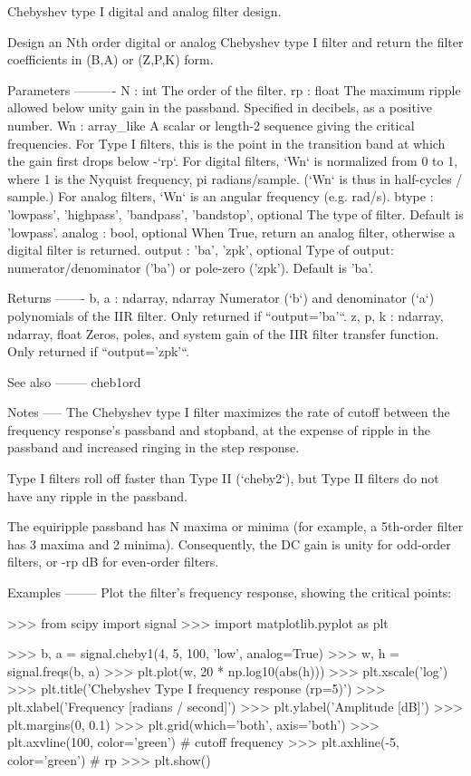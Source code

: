 \begin{DoxyVerb}Chebyshev type I digital and analog filter design.

Design an Nth order digital or analog Chebyshev type I filter and
return the filter coefficients in (B,A) or (Z,P,K) form.

Parameters
----------
N : int
    The order of the filter.
rp : float
    The maximum ripple allowed below unity gain in the passband.
    Specified in decibels, as a positive number.
Wn : array_like
    A scalar or length-2 sequence giving the critical frequencies.
    For Type I filters, this is the point in the transition band at which
    the gain first drops below -`rp`.
    For digital filters, `Wn` is normalized from 0 to 1, where 1 is the
    Nyquist frequency, pi radians/sample.  (`Wn` is thus in
    half-cycles / sample.)
    For analog filters, `Wn` is an angular frequency (e.g. rad/s).
btype : {'lowpass', 'highpass', 'bandpass', 'bandstop'}, optional
    The type of filter.  Default is 'lowpass'.
analog : bool, optional
    When True, return an analog filter, otherwise a digital filter is
    returned.
output : {'ba', 'zpk'}, optional
    Type of output:  numerator/denominator ('ba') or pole-zero ('zpk').
    Default is 'ba'.

Returns
-------
b, a : ndarray, ndarray
    Numerator (`b`) and denominator (`a`) polynomials of the IIR filter.
    Only returned if ``output='ba'``.
z, p, k : ndarray, ndarray, float
    Zeros, poles, and system gain of the IIR filter transfer
    function.  Only returned if ``output='zpk'``.

See also
--------
cheb1ord

Notes
-----
The Chebyshev type I filter maximizes the rate of cutoff between the
frequency response's passband and stopband, at the expense of ripple in
the passband and increased ringing in the step response.

Type I filters roll off faster than Type II (`cheby2`), but Type II
filters do not have any ripple in the passband.

The equiripple passband has N maxima or minima (for example, a
5th-order filter has 3 maxima and 2 minima).  Consequently, the DC gain is
unity for odd-order filters, or -rp dB for even-order filters.

Examples
--------
Plot the filter's frequency response, showing the critical points:

>>> from scipy import signal
>>> import matplotlib.pyplot as plt

>>> b, a = signal.cheby1(4, 5, 100, 'low', analog=True)
>>> w, h = signal.freqs(b, a)
>>> plt.plot(w, 20 * np.log10(abs(h)))
>>> plt.xscale('log')
>>> plt.title('Chebyshev Type I frequency response (rp=5)')
>>> plt.xlabel('Frequency [radians / second]')
>>> plt.ylabel('Amplitude [dB]')
>>> plt.margins(0, 0.1)
>>> plt.grid(which='both', axis='both')
>>> plt.axvline(100, color='green') # cutoff frequency
>>> plt.axhline(-5, color='green') # rp
>>> plt.show()\end{DoxyVerb}
